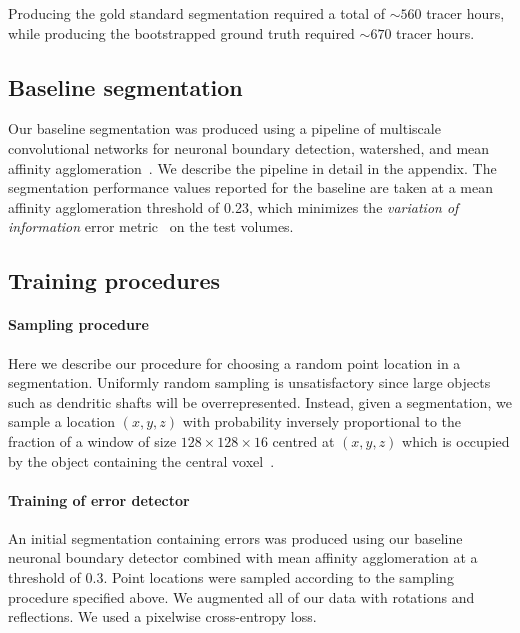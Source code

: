 \documentclass{article}
\begin{document}
Producing the gold standard segmentation required a total of $\sim 560$ tracer hours, while producing the bootstrapped ground truth required $\sim 670$ tracer hours.

\subsection{Baseline segmentation}
Our baseline segmentation was produced using a pipeline of multiscale
convolutional networks for neuronal boundary detection, watershed, and mean
affinity agglomeration~\cite{kisuk}. We describe the pipeline in detail in the
appendix. The segmentation performance values reported for the baseline are
taken at a mean affinity agglomeration threshold of 0.23, which minimizes the
\textsl{variation of information} error metric~\cite{meila2007,vi} on the test
volumes.

\newpage
\subsection{Training procedures}
\paragraph{Sampling procedure}
\label{sec:sampling}
Here we describe our procedure for choosing a random point location in a
segmentation. Uniformly random sampling is unsatisfactory since large objects
such as dendritic shafts will be overrepresented. Instead, given a segmentation,
we sample a location $(x,y,z)$ with probability inversely proportional to the
fraction of a window of size $128 \times 128 \times 16$ centred at $(x,y,z)$
which is occupied by the object containing the central
voxel~\cite{floodfilling}.

\paragraph{Training of error detector} An initial segmentation containing errors
was produced using our baseline neuronal boundary detector combined with mean
affinity agglomeration at a threshold of 0.3. Point locations were sampled
according to the sampling procedure specified above. We augmented all of our
data with rotations and reflections. We used a pixelwise cross-entropy loss.
\end{document}
